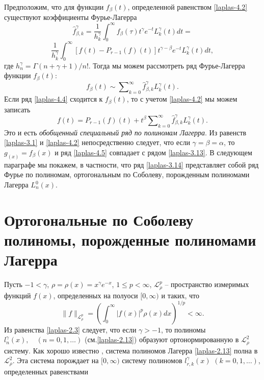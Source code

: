 Предположим, что для функции $f_\beta(t)$, определенной равенством \eqref{laplas-4.2} существуют коэффициенты Фурье-Лагерра
\begin{equation*}
  \hat{f}_{\beta,k}^\gamma=\frac1{h_k^\gamma}\int_0^\infty f_\beta(\tau)t^\gamma e^{-t}L_k^\gamma(t)dt=
\end{equation*}
\begin{equation}\label{laplas-4.3}
  \frac1{h_k^\gamma}\int_0^\infty [f(t)-P_{r-1}(f)(t)]t^{\gamma-\beta}e^{-t}L_k^\gamma(t)dt,
\end{equation}
где $h_n^\gamma=\Gamma(n+\gamma+1)/n!$.
Тогда мы можем рассмотреть ряд Фурье-Лагерра функции $f_\beta(t)$:
\begin{equation}\label{laplas-4.4}
  f_\beta(t)\sim\sum\nolimits_{k=0}^\infty\hat{f}_{\beta,k}^\gamma L_k^\gamma(t).
\end{equation}
Если ряд \eqref{laplas-4.4} сходится к $f_\beta(t)$, то с учетом \eqref{laplas-4.2} мы можем записать
\begin{equation}\label{laplas-4.5}
  f(t)=P_{r-1}(f)(t)+t^\beta\sum\nolimits_{k=0}^\infty\hat{f}_{\beta,k}^\gamma L_k^\gamma(t).
\end{equation}
 Это и есть \textit{ обобщенный специальный ряд по полиномам Лагерра}. Из равенств \eqref{laplas-3.1} и \eqref{laplas-4.2}  непосредственно следует, что  если $\gamma=\beta=\alpha$, то $g_(x)=f_\beta(x)$ и ряд \eqref{laplas-4.5} совпадает с рядом \eqref{laplas-3.13}. В следующем параграфе мы покажем, в частности, что ряд \eqref{laplas-3.14} представляет собой ряд Фурье по полиномам, ортогональным по Соболеву, порожденным полиномами Лагерра $L_n^0(x)$.





\section{Ортогональные по Соболеву полиномы, порожденные полиномами Лагерра}
Пусть $-1<\gamma$,  $\rho=\rho(x)=x^\gamma e^{-x}$, $1\le p<\infty $,  $\mathcal{ L}_{\rho}^p$ -- пространство измеримых функций $f(x)$, определенных на полуоси $[0,\infty)$ и таких, что
     $$
\|f\|_{\mathcal{ L}_{\rho}^p}=
\left(\int_0^\infty|f(x)|^p\rho(x)dx\right)^{1/p}<\infty.
    $$
Из равенства \eqref{laplas-2.3} следует, что если $\gamma>-1$, то полиномы $l_n^{\gamma}(x),\quad(n=0,1,\ldots)$ (см.\eqref{laplas-2.13})
образуют ортонормированную  в $\mathcal{ L}_\rho^2$  систему. Как хорошо известно \cite{Sege}, система полиномов Лагерра  \eqref{laplas-2.13} полна в $\mathcal{ L}_\rho^2$.   Эта система порождает на $[0,\infty)$ систему полиномов $l_{r,k}^{\gamma}(x)$ $(k=0,1,\ldots)$, определенных равенствами

